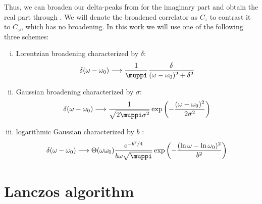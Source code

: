 Thus, we can broaden our delta-peaks from 
for the imaginary part and obtain the real part through .
We will denote the broadened correlator as $C_z$
to contrast it to $C_\omega$, which has no broadening.
In this work we will use one of the following three schemes:
\begin{enumerate}[(i)]
    \item Lorentzian broadening characterized by $\delta$:
          \label{item:lorentzian}
          \begin{equation}
              \delta(\omega - \omega_0)
              \longrightarrow
              \frac{1}{\muppi}\frac{\delta}{(\omega - \omega_0)^2 + \delta^2}
          \end{equation}
    \item Gaussian broadening characterized by $\sigma$:
          \label{item:gaussian}
          \begin{equation}
              \delta(\omega - \omega_0)
              \longrightarrow
              \frac{1}{\sqrt{2\muppi \sigma^2}}\exp\left(-\frac{(\omega - \omega_0)^2}{2\sigma^2}\right)
          \end{equation}
    \item logarithmic Gaussian characterized by $b$ \cite{Bulla2008}:
          \label{item:logarithmic-gaussian}
          \begin{equation}
              \delta(\omega - \omega_0)
              \longrightarrow
              \Theta(\omega\omega_0)\frac{\me^{-b^2/4}}{b\omega\sqrt{\muppi}}\exp\left(-\frac{(\ln\omega-\ln\omega_0)^2}{b^2}\right)
          \end{equation}
\end{enumerate}

\section{Lanczos algorithm}

